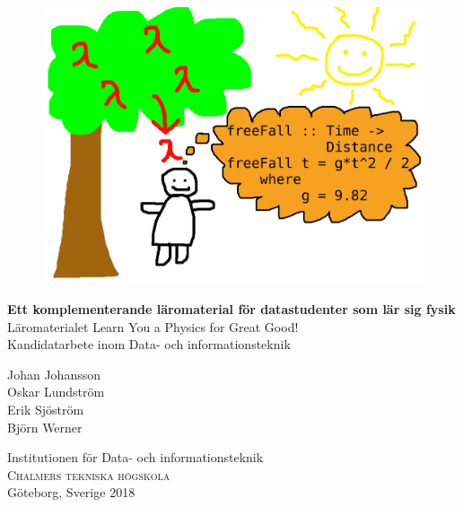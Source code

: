 
\begin{titlepage}

\addtolength{\voffset}{2cm}

\begin{figure}[H]
\centering
\vspace{0cm}	%
\includegraphics[width=0.99\linewidth]{figure/Framsida.png}
\end{figure}

\renewcommand{\familydefault}{\sfdefault} \normalfont %
\vfill
\textbf{{\Huge  Ett komplementerande läromaterial för datastudenter som lär sig fysik}} 	\\[0.5cm]
{\Large Läromaterialet Learn You a Physics for Great Good!}\\[0.5cm]
Kandidatarbete inom Data- och informationsteknik
\setlength{\parskip}{1cm}

{\Large Johan Johansson \\[0.3cm]
Oskar Lundström \\[0.3cm]
Erik Sjöström \\[0.2cm]
Björn Werner \\[0.2cm]}

Institutionen för Data- och informationsteknik \\
\textsc{Chalmers tekniska högskola} \\
Göteborg, Sverige 2018

\renewcommand{\familydefault}{\rmdefault} \normalfont %
\end{titlepage}


